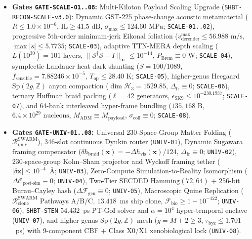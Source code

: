 \documentclass[11pt,onecolumn]{article}
\begin{document}
\begin{itemize}
    \item \textbf{Gates \texttt{GATE-}\allowbreak\texttt{SCALE-01..08}:} Multi-Kiloton Payload Scaling Upgrade (\texttt{SHBT-RECON-}\allowbreak\texttt{SCALE-v3.0}): Dynamic GST-225 phase-change acoustic metamaterial ($R \le 1.0\times 10^{-6}$, $\text{IL} \ge 41.5\text{ dB}$, $\sigma_{\max} \le 124.60\text{ MPa}$; \texttt{SCALE-01..02}), progressive 5th-order minimum-jerk Eikonal foliation ($v_{\text{derender}}^{\max} \le 56.988\text{ m/s}$, $\max |\ddot{s}| \le 5.7735$; \texttt{SCALE-03}), adaptive TTN-MERA depth scaling ($L(10^{30}) = 101\text{ layers}$, $\|\mathcal{S}^\dagger\mathcal{S}-I\|_\infty \le 10^{-14}$, $P_{\text{Brem}} \equiv 0\text{ W}$; \texttt{SCALE-04}), symplectic Landauer heat dark shunting ($S = 100/1089$, $f_{\text{sensible}} = 7.88246\times 10^{-5}$, $T_{\text{op}} \le 28.40\text{ K}$; \texttt{SCALE-05}), higher-genus Heegaard $\mathrm{Sp}(2g, \mathbb{Z})$ anyon compaction ($\dim \mathcal{H}_3 = 1529.85$, $\Delta_{\text{fr}} \equiv 0$; \texttt{SCALE-06}), ternary Huffman braid packing ($\ell = 42\text{ generators}$, $\epsilon_{\text{SK9}} \le 10^{-230.1937}$; \texttt{SCALE-07}), and 64-bank interleaved hyper-frame bundling ($135{,}168\text{ B}$, $6.4\times 10^{29}\text{ nucleons}$, $M_{\text{ADM}} \equiv M_{\text{payload}}$, $\sigma_{\text{coll}} \equiv 0$; \texttt{SCALE-08}).
    \item \textbf{Gates \texttt{GATE-}\allowbreak\texttt{UNIV-01..08}:} Universal 230-Space-Group Matter Folding ($\mathcal{R}_{\text{univ}}^{\text{SWARM}}$), 346-slot continuous Dynkin router (\texttt{UNIV-01}), Dynamic Sugawara framing compensator ($\delta h_{\text{braid}}(\mathbf{x}) = -\Delta h_{\text{vis}}(\mathbf{x})/124$, $\Delta_{\text{fr}} \equiv 0$; \texttt{UNIV-02}), 230-space-group Kohn--Sham projector and Wyckoff framing tether ($|\delta\mathbf{x}| \le 10^{-4}$~\AA; \texttt{UNIV-03}), Zero-Compute Simulation-to-Reality Isomorphism ($\Delta\mathcal{C}_{\text{post-sim}} \equiv 0$; \texttt{UNIV-04}), Two-Tier SECDED $\mathrm{Hamming}(72,64)$ + 256-bit Burau--Cayley hash ($\Delta\mathcal{F}_{\text{gen}} \equiv 0$; \texttt{UNIV-05}), Macroscopic Quine Replication ($\mathcal{R}_{\text{clone}}^{\text{SWARM}}$ Pathways A/B/C, $13.418$~ms ship clone, $\mathcal{F}_{\text{bio}} \ge 1 - 10^{-122}$; \texttt{UNIV-06}), \texttt{SHBT-STEN} $54.432$~ps PT-GoI solver and $\alpha = 10^4$ hyper-temporal enclave (\texttt{UNIV-07}), and higher-genus $\mathrm{Sp}(2g, \mathbb{Z})$ mesh ($g = M + 2 \ge 3$, $\tau_{\text{byz}} \le 1.701$~ps) with 9-component CBF + Class X0/X1 xenobiological lock (\texttt{UNIV-08}).

\end{itemize}
\end{document}
